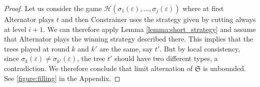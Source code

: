 \begin{proof}
Let us consider the game $\mathcal{H}( \sigma_1(\varepsilon), \dots, \sigma_j(\varepsilon))$ where at first Alternator plays $t$ and then Constrainer uses the strategy given by cutting always at level $i+1$. We can therefore apply Lemma \ref{lemma:short_strategy} and assume that Alternator plays the winning strategy described there. This implies that the trees played at round $k$ and $k'$ are the same, say $t'$. But by local consistency, since $\sigma_k(\varepsilon)\neq \sigma_{k'}(\varepsilon)$, the tree $t'$ should have two different types, a contradiction. We therefore conclude that limit alternation of $\mathfrak{S}$ is unbounded. 
See \ref{figure:filling} in the Appendix.
\end{proof}
